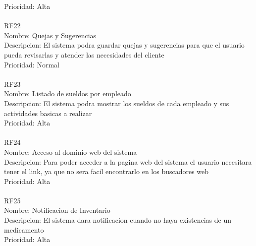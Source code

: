 Prioridad: Alta\\
\\
RF22\\
Nombre: Quejas y Sugerencias\\
Descripcion: El sistema podra guardar quejas y sugerencias para que el usuario pueda revisarlas y atender las necesidades del cliente\\
Prioridad: Normal\\
\\
RF23\\
Nombre: Listado de sueldos por empleado\\
Descripcion: El sistema podra mostrar los sueldos de cada empleado y sus actividades basicas a realizar\\
Prioridad: Alta\\
\\
RF24\\
Nombre: Acceso al dominio web del sistema\\
Descripcion: Para poder acceder a la pagina web del sistema el usuario necesitara tener el link, ya que no sera facil encontrarlo en los buscadores web\\
Prioridad: Alta\\
\\
RF25\\
Nombre: Notificacion de Inventario\\
Descripcion: El sistema dara notificacion cuando no haya existencias de un medicamento\\
Prioridad: Alta\\
\\
\newpage
